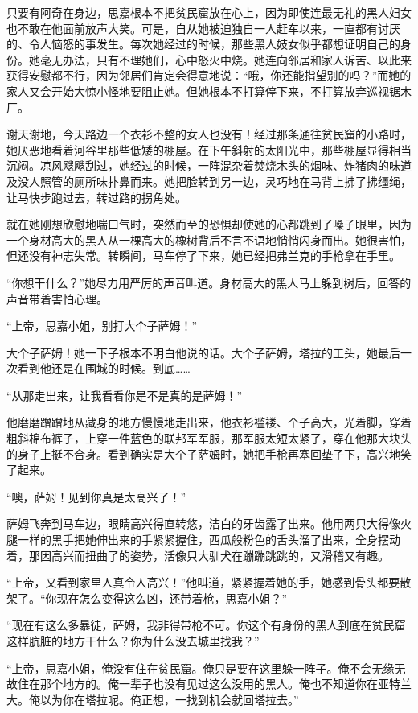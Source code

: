 \par 只要有阿奇在身边，思嘉根本不把贫民窟放在心上，因为即使连最无礼的黑人妇女也不敢在他面前放声大笑。可是，自从她被迫独自一人赶车以来，一直都有讨厌的、令人恼怒的事发生。每次她经过的时候，那些黑人妓女似乎都想证明自己的身份。她毫无办法，只有不理她们，心中怒火中烧。她连向邻居和家人诉苦、以此来获得安慰都不行，因为邻居们肯定会得意地说：“哦，你还能指望别的吗？”而她的家人又会开始大惊小怪地要阻止她。但她根本不打算停下来，不打算放弃巡视锯木厂。
\par 谢天谢地，今天路边一个衣衫不整的女人也没有！经过那条通往贫民窟的小路时，她厌恶地看着河谷里那些低矮的棚屋。在下午斜射的太阳光中，那些棚屋显得相当沉闷。凉风飕飕刮过，她经过的时候，一阵混杂着焚烧木头的烟味、炸猪肉的味道及没人照管的厕所味扑鼻而来。她把脸转到另一边，灵巧地在马背上拂了拂缰绳，让马快步跑过去，转过路的拐角处。
\par 就在她刚想欣慰地喘口气时，突然而至的恐惧却使她的心都跳到了嗓子眼里，因为一个身材高大的黑人从一棵高大的橡树背后不言不语地悄悄闪身而出。她很害怕，但还没有神志失常。转瞬间，马车停了下来，她已经把弗兰克的手枪拿在手里。
\par “你想干什么？”她尽力用严厉的声音叫道。身材高大的黑人马上躲到树后，回答的声音带着害怕心理。
\par “上帝，思嘉小姐，别打大个子萨姆！”
\par 大个子萨姆！她一下子根本不明白他说的话。大个子萨姆，塔拉的工头，她最后一次看到他还是在围城的时候。到底……
\par “从那走出来，让我看看你是不是真的是萨姆！”
\par 他磨磨蹭蹭地从藏身的地方慢慢地走出来，他衣衫褴褛、个子高大，光着脚，穿着粗斜棉布裤子，上穿一件蓝色的联邦军军服，那军服太短太紧了，穿在他那大块头的身子上挺不合身。看到确实是大个子萨姆时，她把手枪再塞回垫子下，高兴地笑了起来。
\par “噢，萨姆！见到你真是太高兴了！”
\par 萨姆飞奔到马车边，眼睛高兴得直转悠，洁白的牙齿露了出来。他用两只大得像火腿一样的黑手把她伸出来的手紧紧握住，西瓜般粉色的舌头溜了出来，全身摆动着，那因高兴而扭曲了的姿势，活像只大驯犬在蹦蹦跳跳的，又滑稽又有趣。
\par “上帝，又看到家里人真令人高兴！”他叫道，紧紧握着她的手，她感到骨头都要散架了。“你现在怎么变得这么凶，还带着枪，思嘉小姐？”
\par “现在有这么多暴徒，萨姆，我非得带枪不可。你这个有身份的黑人到底在贫民窟这样肮脏的地方干什么？你为什么没去城里找我？”
\par “上帝，思嘉小姐，俺没有住在贫民窟。俺只是要在这里躲一阵子。俺不会无缘无故住在那个地方的。俺一辈子也没有见过这么没用的黑人。俺也不知道你在亚特兰大。俺以为你在塔拉呢。俺正想，一找到机会就回塔拉去。”
